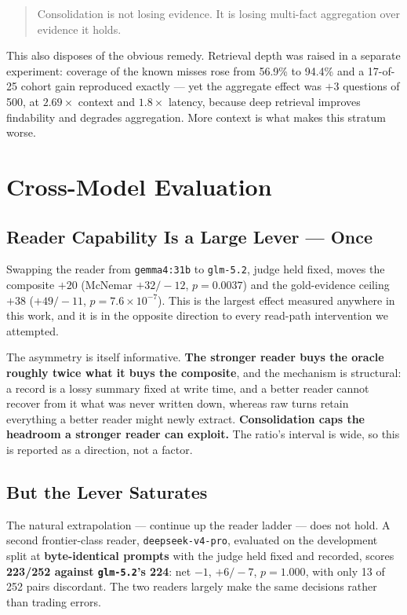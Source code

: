 \begin{quote}
Consolidation is not losing evidence. It is losing multi-fact aggregation over evidence it holds.
\end{quote}

This also disposes of the obvious remedy. Retrieval depth was raised in a separate experiment: coverage of the known misses rose from 56.9\% to 94.4\% and a 17-of-25 cohort gain reproduced exactly --- yet the aggregate effect was $+3$ questions of 500, at $2.69\times$ context and $1.8\times$ latency, because deep retrieval improves findability and degrades aggregation. More context is what makes this stratum worse.

\section{Cross-Model Evaluation}
\label{sec:crossmodel}

\subsection{Reader Capability Is a Large Lever --- Once}

Swapping the reader from \texttt{gemma4:31b} to \texttt{glm-5.2}, judge held fixed, moves the composite $+20$ (McNemar $+32/-12$, $p = 0.0037$) and the gold-evidence ceiling $+38$ ($+49/-11$, $p = 7.6 \times 10^{-7}$). This is the largest effect measured anywhere in this work, and it is in the opposite direction to every read-path intervention we attempted.

The asymmetry is itself informative. \textbf{The stronger reader buys the oracle roughly twice what it buys the composite}, and the mechanism is structural: a record is a lossy summary fixed at write time, and a better reader cannot recover from it what was never written down, whereas raw turns retain everything a better reader might newly extract. \textbf{Consolidation caps the headroom a stronger reader can exploit.} The ratio's interval is wide, so this is reported as a direction, not a factor.

\subsection{But the Lever Saturates}

The natural extrapolation --- continue up the reader ladder --- does not hold. A second frontier-class reader, \texttt{deepseek-v4-pro}, evaluated on the development split at \textbf{byte-identical prompts} with the judge held fixed and recorded, scores \textbf{223/252 against \texttt{glm-5.2}'s 224}: net $-1$, $+6/-7$, $p = 1.000$, with only 13 of 252 pairs discordant. The two readers largely make the same decisions rather than trading errors.

